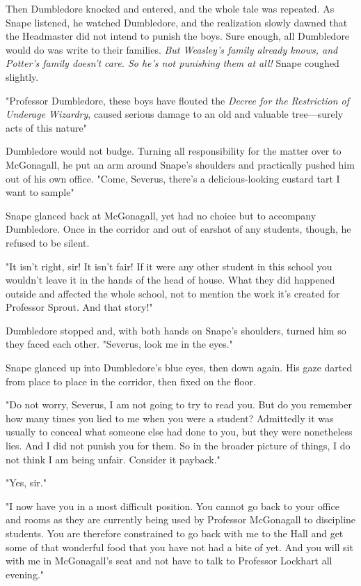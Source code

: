 Then Dumbledore knocked and entered, and the whole tale was repeated. As Snape listened, he watched Dumbledore, and the realization slowly dawned that the Headmaster did not intend to punish the boys. Sure enough, all Dumbledore would do was write to their families. \emph{But Weasley's family already knows, and Potter's family doesn't care. So he's not punishing them at all!} Snape coughed slightly.

"Professor Dumbledore, these boys have flouted the \emph{Decree for the Restriction of Underage Wizardry}, caused serious damage to an old and valuable tree—surely acts of this nature{\el}"

Dumbledore would not budge. Turning all responsibility for the matter over to McGonagall, he put an arm around Snape's shoulders and practically pushed him out of his own office. "Come, Severus, there's a delicious-looking custard tart I want to sample{\el}"

Snape glanced back at McGonagall, yet had no choice but to accompany Dumbledore. Once in the corridor and out of earshot of any students, though, he refused to be silent.

"It isn't right, sir! It isn't fair! If it were any other student in this school you wouldn't leave it in the hands of the head of house. What they did happened outside and affected the whole school, not to mention the work it's created for Professor Sprout. And that story!"

Dumbledore stopped and, with both hands on Snape's shoulders, turned him so they faced each other. "Severus, look me in the eyes."

Snape glanced up into Dumbledore's blue eyes, then down again. His gaze darted from place to place in the corridor, then fixed on the floor.

"Do not worry, Severus, I am not going to try to read you. But do you remember how many times you lied to me when you were a student? Admittedly it was usually to conceal what someone else had done to you, but they were nonetheless lies. And I did not punish you for them. So in the broader picture of things, I do not think I am being unfair. Consider it payback."

"Yes, sir."

"I now have you in a most difficult position. You cannot go back to your office and rooms as they are currently being used by Professor McGonagall to discipline students. You are therefore constrained to go back with me to the Hall and get some of that wonderful food that you have not had a bite of yet. And you will sit with me in McGonagall's seat and not have to talk to Professor Lockhart all evening."

